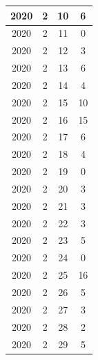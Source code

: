 \begin{table}
\begin{tabular}{|c|c|c|c|}
\hline
2020         & 2            & 10           & 6                           \\ 
\hline
2020         & 2            & 11           & 0                           \\ 
\hline
2020         & 2            & 12           & 3                           \\ 
\hline
2020         & 2            & 13           & 6                           \\ 
\hline
2020         & 2            & 14           & 4                           \\ 
\hline
2020         & 2            & 15           & 10                          \\ 
\hline
2020         & 2            & 16           & 15                          \\ 
\hline
2020         & 2            & 17           & 6                           \\ 
\hline
2020         & 2            & 18           & 4                           \\ 
\hline
2020         & 2            & 19           & 0                           \\ 
\hline
2020         & 2            & 20           & 3                           \\ 
\hline
2020         & 2            & 21           & 3                           \\ 
\hline
2020         & 2            & 22           & 3                           \\ 
\hline
2020         & 2            & 23           & 5                           \\ 
\hline
2020         & 2            & 24           & 0                           \\ 
\hline
2020         & 2            & 25           & 16                          \\ 
\hline
2020         & 2            & 26           & 5                           \\ 
\hline
2020         & 2            & 27           & 3                           \\ 
\hline
2020         & 2            & 28           & 2                           \\ 
\hline
2020         & 2            & 29           & 5                           \\
\hline
\end{tabular}
\end{table}


